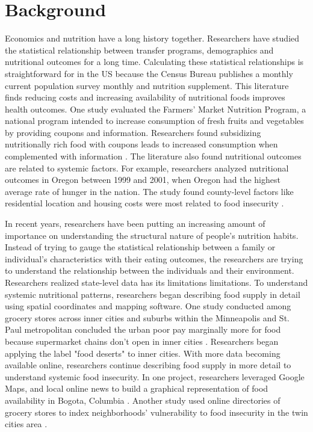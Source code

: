 \documentclass{report}
\begin{document}
\section{Background}
Economics and nutrition have a long history together. Researchers have studied the statistical relationship between transfer programs, demographics and nutritional outcomes for a long time. Calculating these statistical relationships is straightforward for in the US because the Census Bureau publishes a monthly current population survey monthly and nutrition supplement. This literature finds reducing costs and increasing availability of nutritional foods improves health outcomes. One study evaluated the Farmers' Market Nutrition Program, a national program intended to increase consumption of fresh fruits and vegetables by providing coupons and information. Researchers found subsidizing nutritionally rich food with coupons leads to increased consumption when complemented with information \cite{Just}. The literature also found nutritional outcomes are related to systemic factors. For example, researchers analyzed nutritional outcomes in Oregon between 1999 and 2001, when Oregon had the highest average rate of hunger in the nation. The study found county-level factors like residential location and housing costs were most related to food insecurity \cite{Bernell}. 
 
In recent years, researchers have been putting an increasing amount of importance on understanding the structural nature of people's nutrition habits. Instead of trying to gauge the statistical relationship between a family or individual's characteristics with their eating outcomes, the researchers are trying to understand the relationship between the individuals and their environment. Researchers realized state-level data has its limitations limitations. To understand systemic nutritional patterns, researchers began describing food supply in detail using spatial coordinates and mapping software.  One study conducted among grocery stores across inner cities and suburbs within the Minneapolis and St. Paul metropolitan concluded the urban poor pay marginally more for food because supermarket chains don't open in inner cities \cite{Chung}. Researchers began applying the label "food deserts" to inner cities. With more data becoming available online, researchers continue describing food supply in more detail to understand systemic food insecurity. In one project, researchers leveraged Google Maps, and local online news to build a graphical representation of food availability in Bogota, Columbia \cite{Hwang}. Another study used online directories of grocery stores to index neighborhoods' vulnerability to food insecurity in the twin cities area \cite{Larson}.
\end{document}
